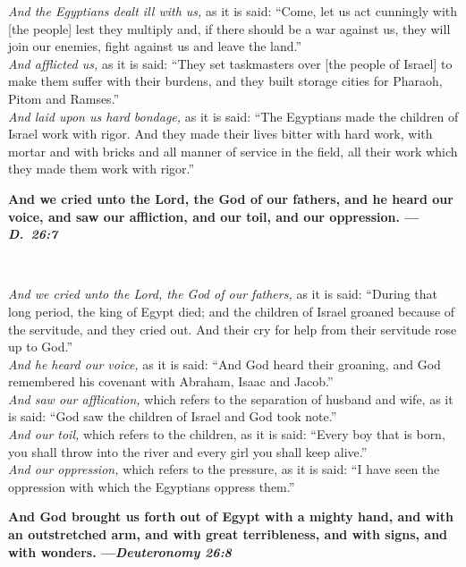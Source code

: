 \documentclass[letter,11pt,openany]{memoir}
\newcommand{\HgSource}[1]{\hfill{\small---\itshape{#1}}}
\newcommand{\HgHL}[1]{{\Large\textbf{#1}\par\noindent\\[-.5em]}}
\begin{document}
{\small
\noindent
{\itshape And the Egyptians dealt ill with us,} as it is said: ``Come, let us act
cunningly with [the people] lest they multiply and, if there should be a war
against us, they will join our enemies, fight against us and leave the
land.''\\[1em]
{\itshape And afflicted us,} as it is said: ``They set taskmasters over [the people of
Israel] to make them suffer with their burdens, and they built storage cities
for Pharaoh, Pitom and Ramses.''\\[1em]
{\itshape And laid upon us hard bondage,} as it is said: ``The Egyptians made the
children of Israel work with rigor. And they made their lives bitter with hard
work, with mortar and with bricks and all manner of service in the field, all
their work which they made them work with rigor.''
}

\pagebreak

\noindent
\HgHL{%
  And we cried unto the Lord, the
  God of our fathers, and he heard our voice, and saw our affliction, and our
  toil, and our oppression.
  \HgSource{D.\ 26:7}
}

\vspace{-1em}
{\small
\noindent
{\itshape And we cried unto the Lord, the God of our fathers,}
as it is said: ``During that long period, the king of Egypt died; and the
children of Israel groaned because of the servitude, and they cried out. And
their cry for help from their servitude rose up to God.''\\[1em]
{\itshape And he heard our voice,} as it is said: ``And God heard their
groaning, and God remembered his covenant with Abraham, Isaac and
Jacob.'' \\[1em]
{\itshape And saw our afflication,} which refers to the separation of husband
and wife, as it is said: ``God saw the children of Israel and God took
note.'' \\[1em]
{\itshape And our toil,} which refers to the children, as it is said: ``Every
boy that is born, you shall throw into the river and every girl you shall keep
alive.'' \\[1em]
{\itshape And our oppression,} which refers to the pressure, as it is said: ``I
have seen the oppression with which the Egyptians oppress them.'' \\[1em]
}

\vspace{-.6em}
\noindent
\HgHL{%
  And God brought us forth out of Egypt with a mighty hand, and with an
  outstretched arm, and with great terribleness, and with signs, and with
  wonders.
  \HgSource{Deuteronomy 26:8}
}
\end{document}
